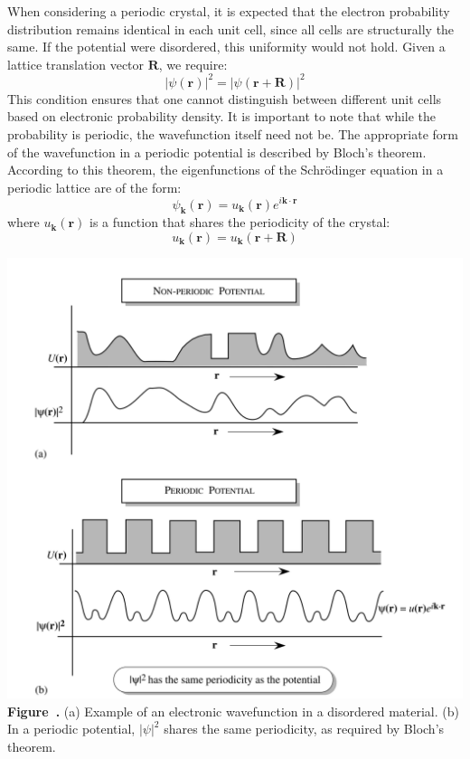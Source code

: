 When considering a periodic crystal, it is expected that the electron probability distribution remains identical in each unit cell, since all cells are structurally the same. If the potential were disordered, this uniformity would not hold. Given a lattice translation vector \( \mathbf{R} \), we require:
\begin{equation*}
	|\psi(\mathbf{r})|^2 = |\psi(\mathbf{r} + \mathbf{R})|^2
\end{equation*}
This condition ensures that one cannot distinguish between different unit cells based on electronic probability density. It is important to note that while the probability is periodic, the wavefunction itself need not be. The appropriate form of the wavefunction in a periodic potential is described by Bloch’s theorem. According to this theorem, the eigenfunctions of the Schrödinger equation in a periodic lattice are of the form:
\begin{equation*}
	\psi_{\mathbf{k}}(\mathbf{r}) = u_{\mathbf{k}}(\mathbf{r}) e^{i\mathbf{k} \cdot \mathbf{r}}
\end{equation*}
where \( u_{\mathbf{k}}(\mathbf{r}) \) is a function that shares the periodicity of the crystal:
\begin{equation*}
	u_{\mathbf{k}}(\mathbf{r}) = u_{\mathbf{k}}(\mathbf{r} + \mathbf{R})
\end{equation*}
\begin{center}
	\begin{minipage}{0.6\textwidth}
		\centering
		\includegraphics[width=\textwidth]{img/periodic_potential.png}
		\\[0.5em]
		\textbf{Figure~\thefigure.} (a) Example of an electronic wavefunction in a disordered material. (b) In a periodic potential, \( |\psi|^2 \) shares the same periodicity, as required by Bloch's theorem.
		\label{fig:periodic_potential}
	\end{minipage}
\end{center}
